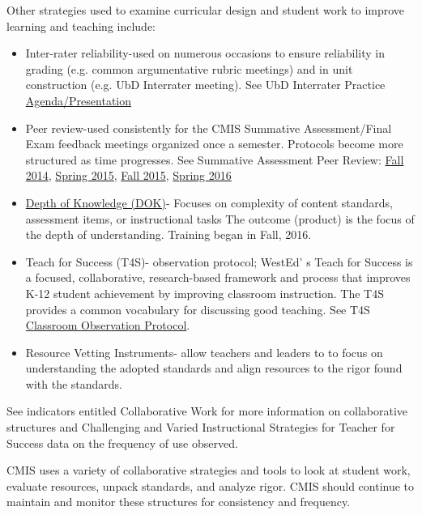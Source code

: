 \begin{findings}
Other strategies used to examine curricular design and student work to improve learning and teaching include:
\begin{itemize}
\item Inter-rater reliability-used on numerous occasions to ensure reliability in grading (e.g. common argumentative rubric meetings) and in unit construction (e.g. UbD Interrater meeting). See UbD Interrater Practice \href{https://docs.google.com/presentation/d/18f8rB_VHa8vQhp-cbmgXFCCJEZ0QB3QkEIp2BiChwyM/edit#slide=id.gd6a9d401a_3_0}{Agenda/Presentation} 
\item Peer review-used consistently for the CMIS Summative Assessment/Final Exam feedback meetings organized once a semester. Protocols become more structured as time progresses. See Summative Assessment Peer Review: \href{https://drive.google.com/a/cmis.ac.th/folderview?id=0ByVFfrm0zfolTHY0dmtURG5pcGs&usp=sharing}{Fall 2014}, \href{https://drive.google.com/a/cmis.ac.th/folderview?id=0ByVFfrm0zfolaWQzeWxCTlVyUFU&usp=sharing}{Spring 2015}, \href{https://drive.google.com/a/cmis.ac.th/folderview?id=0ByVFfrm0zfolRjQzTDhmT0dyYzg&usp=sharing}{Fall 2015}, \href{https://drive.google.com/a/cmis.ac.th/folderview?id=0ByVFfrm0zfolT29vQXpQeXp3VlU&usp=sharing}{Spring 2016} 
\item \href{https://docs.google.com/a/cmis.ac.th/presentation/d/1GDBfSgHVsW5KKXvlBzm-JipLzBO_tWI0R1TlEOwIZ88/edit?usp=sharing}{Depth of Knowledge (DOK)}- Focuses on complexity of content standards, assessment items, or instructional tasks The outcome (product) is the focus of the depth of understanding. Training began in Fall, 2016. 
\item Teach for Success (T4S)- observation protocol; WestEd' s Teach for Success is a focused, collaborative, research-based framework and process that improves K-12 student achievement by improving classroom instruction. The T4S provides a common vocabulary for discussing good teaching. See T4S \href{https://docs.google.com/a/cmis.ac.th/spreadsheets/d/1ACz3l3DPUgIqRhmZ1LWk9RwVBjo0iLsbJAupJoic5Dg/edit?usp=sharing}{Classroom Observation Protocol}.
\item Resource Vetting Instruments- allow teachers and leaders to to focus on understanding the adopted standards and align resources to the rigor found with the standards. 
\end{itemize}
See indicators entitled Collaborative Work for more information on collaborative structures and Challenging and Varied Instructional Strategies for Teacher for Success data on the frequency of use observed.   


CMIS  uses a variety of collaborative strategies and tools to look at student work, evaluate resources, unpack standards, and analyze rigor. CMIS should continue to maintain and monitor these structures for consistency and frequency. 
\end{findings}

